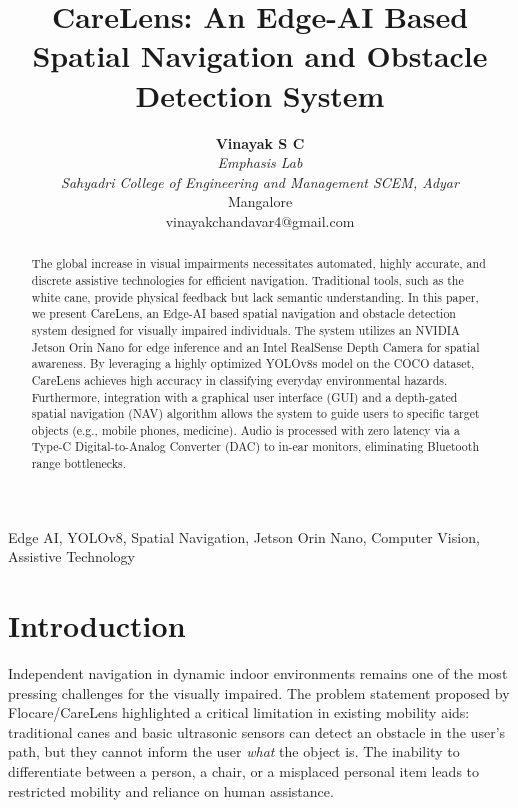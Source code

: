 \documentclass[12pt,onecolumn]{IEEEtran}
\begin{document}
\title{CareLens: An Edge-AI Based Spatial Navigation and Obstacle Detection System\\}

\author{
    \textbf{Vinayak S C} \\
    \textit{Emphasis Lab} \\
    \textit{Sahyadri College of Engineering and Management SCEM, Adyar}\\
    Mangalore\\
    vinayakchandavar4@gmail.com
}

\maketitle

\begin{abstract}
The global increase in visual impairments necessitates automated, highly accurate, and discrete assistive technologies for efficient navigation. Traditional tools, such as the white cane, provide physical feedback but lack semantic understanding. In this paper, we present CareLens, an Edge-AI based spatial navigation and obstacle detection system designed for visually impaired individuals. The system utilizes an NVIDIA Jetson Orin Nano for edge inference and an Intel RealSense Depth Camera for spatial awareness. By leveraging a highly optimized YOLOv8s model on the COCO dataset, CareLens achieves high accuracy in classifying everyday environmental hazards. Furthermore, integration with a graphical user interface (GUI) and a depth-gated spatial navigation (NAV) algorithm allows the system to guide users to specific target objects (e.g., mobile phones, medicine). Audio is processed with zero latency via a Type-C Digital-to-Analog Converter (DAC) to in-ear monitors, eliminating Bluetooth range bottlenecks. 
\end{abstract}

\begin{IEEEkeywords}
Edge AI, YOLOv8, Spatial Navigation, Jetson Orin Nano, Computer Vision, Assistive Technology
\end{IEEEkeywords}

\section{Introduction}
Independent navigation in dynamic indoor environments remains one of the most pressing challenges for the visually impaired. The problem statement proposed by Flocare/CareLens highlighted a critical limitation in existing mobility aids: traditional canes and basic ultrasonic sensors can detect an obstacle in the user's path, but they cannot inform the user \textit{what} the object is. The inability to differentiate between a person, a chair, or a misplaced personal item leads to restricted mobility and reliance on human assistance.
\end{document}
